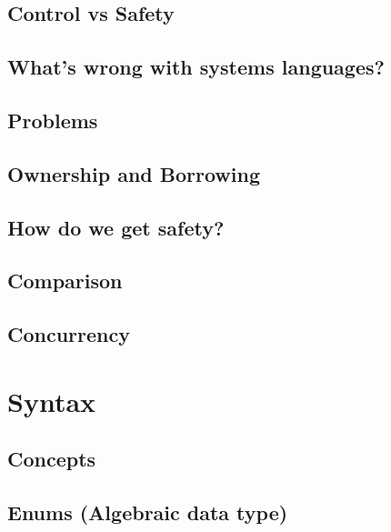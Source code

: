 \documentclass[%
final,
xcolor = table,
usenames,
dvipsnames,
table,
aspectratio = 169]{beamer}
\begin{document}
\subsection{Control vs Safety}


\subsection{What's wrong with systems languages?}


\subsection{Problems}


\subsection{Ownership and Borrowing}




\subsection{How do we get safety?}


\subsection{Comparison}


\subsection{Concurrency}



\section{Syntax}


\subsection{Concepts}


\subsection{Enums (Algebraic data type)}

\end{document}
